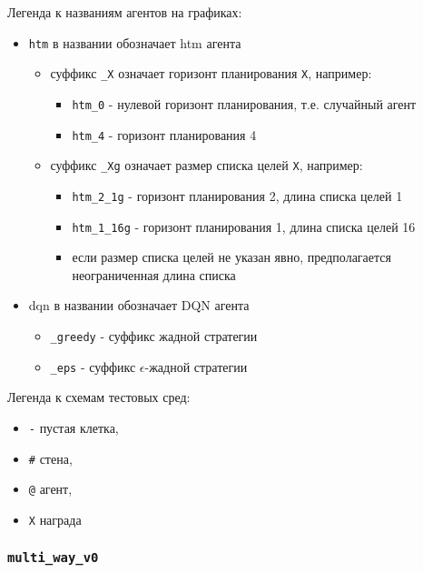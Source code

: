 \documentclass[a4paper]{article}
\begin{document}
Легенда к названиям агентов на графиках:

\begin{itemize}
    \item \verb|htm| в названии обозначает htm агента
    \begin{itemize}
        \item суффикс \verb|_X| означает горизонт планирования \verb|X|, например:
        \begin{itemize}
            \item \verb|htm_0| - нулевой горизонт планирования, т.е. случайный агент
            \item \verb|htm_4| - горизонт планирования 4
        \end{itemize}
        
        \item суффикс \verb|_Xg| означает размер списка целей \verb|X|, например:
        \begin{itemize}
            \item \verb|htm_2_1g| - горизонт планирования 2, длина списка целей 1
            \item \verb|htm_1_16g| - горизонт планирования 1, длина списка целей 16
            \item если размер списка целей не указан явно, предполагается неограниченная длина списка
        \end{itemize}
    \end{itemize}
    
    \item dqn в названии обозначает DQN агента
    \begin{itemize}
        \item \verb|_greedy| - суффикс жадной стратегии
        \item \verb|_eps| - суффикс $\epsilon$-жадной стратегии
    \end{itemize}
\end{itemize}

Легенда к схемам тестовых сред:

\begin{itemize}
    \item \verb|-| пустая клетка,
    \item \verb|#| стена,
    \item \verb|@| агент,
    \item \verb|X| награда
\end{itemize}

\subsubsection {\texttt{multi\_way\_v0}}
\end{document}
